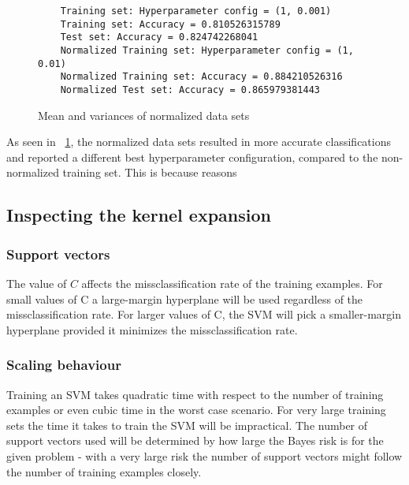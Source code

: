 \documentclass[a4paper]{article}
\begin{document}
\begin{figure}[H]
	\begin{lstlisting}
	Training set: Hyperparameter config = (1, 0.001)
	Training set: Accuracy = 0.810526315789
	Test set: Accuracy = 0.824742268041
	Normalized Training set: Hyperparameter config = (1, 0.01)
	Normalized Training set: Accuracy = 0.884210526316
	Normalized Test set: Accuracy = 0.865979381443
	\end{lstlisting}
	\caption{Mean and variances of normalized data sets}
	\label{fig:grid_search_results}
\end{figure}

As seen in ~\ref{fig:grid_search_results}, the normalized data sets resulted in more accurate classifications and reported a different best hyperparameter configuration, compared to the non-normalized training set. This is because reasons


\subsection{Inspecting the kernel expansion}

\subsubsection{Support vectors}

The value of $C$ affects the missclassification rate of the training examples. For small values of C a large-margin hyperplane will be used regardless of the missclassification rate. For larger values of C, the SVM will pick a smaller-margin hyperplane provided it minimizes the missclassification rate. 

\subsubsection{Scaling behaviour}

Training an SVM takes quadratic time with respect to the number of training examples or even cubic time in the worst case scenario. For very large training sets the time it takes to train the SVM will be impractical. The number of support vectors used will be determined by how large the Bayes risk is for the given problem - with a very large risk the number of support vectors might follow the number of training examples closely.
\end{document}
